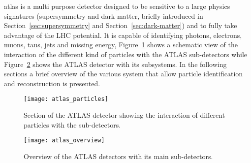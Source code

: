 \gls{atlas} is a multi purpose detector designed to be sensitive to a large
physics signatures (supersymmetry and dark matter, briefly introduced in
Section~\ref{sec:supersymmetry} and Section~\ref{sec:dark-matter}) and to fully
take advantage of the LHC potential. It is capable of identifying photons,
electrons, muons, taus, jets and missing energy,
Figure~\ref{fig:atlas_particles} shows a schematic view of the interaction of
the different kind of particles with the ATLAS sub-detectors while
Figure~\ref{fig:atlas_overview} shows the ATLAS detector with its subsystems. In
the following sections a brief overview of the various system that allow
particle identification and reconstruction is presented.

\begin{figure}[!h]
  \centering
    \texttt{[image: atlas\_particles]}
    \caption{Section of the ATLAS detector showing the interaction of different
      particles with the sub-detectors.}
    \label{fig:atlas_particles}
\end{figure}
\begin{figure}
  \centering
    \texttt{[image: atlas\_overview]}
    \caption{Overview of the ATLAS detectors with its main sub-detectors.}
    \label{fig:atlas_overview}
\end{figure}
